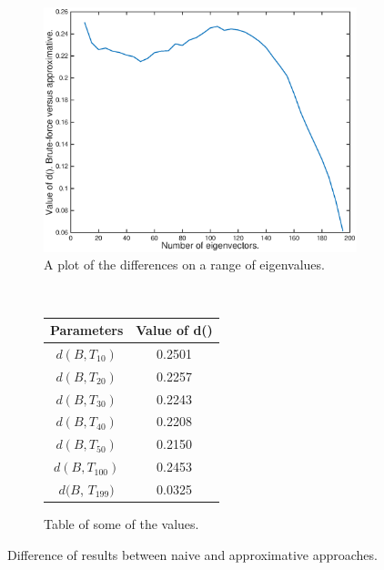 \documentclass[12pt]{report}
\begin{document}
\begin{figure}[tpb]
        \centering
        \begin{subfigure}[b]{0.6\textwidth}
	        \includegraphics[width=\textwidth]{no-of-eigenvectors}
        		\caption{A plot of the differences on a range of eigenvalues.}
        \end{subfigure}%
        ~
        \begin{subfigure}[b]{0.4\textwidth}
           \centering
           \def\arraystretch{1.5}
           \begin{tabular}{|c|c|}
	   \hline
	   Parameters & Value of d() \\
	   \hline
	   $d(B, T_{10})$ & 0.2501 \\
	   \hline
	   $d(B, T_{20})$ & 0.2257   \\
	   \hline
   	   $d(B, T_{30})$ & 0.2243   \\
	   \hline
	   $d(B, T_{40})$ & 0.2208   \\
	   \hline
	   $d(B, T_{50})$ & 0.2150 \\
	   \hline
	   $d(B, T_{100})$ & 0.2453\\
	   \hline
	    $d(B$, $T_{199})$ & 0.0325 \\
	    \hline
	   \end{tabular}
	   \caption{Table of some of the values.}
	   \label{tbl:comparisons}
        \end{subfigure}%
        \caption{Difference of results between naive and approximative approaches.}
	\label{fig:no-of-eigenvectors}
\end{figure}
%
\end{document}
